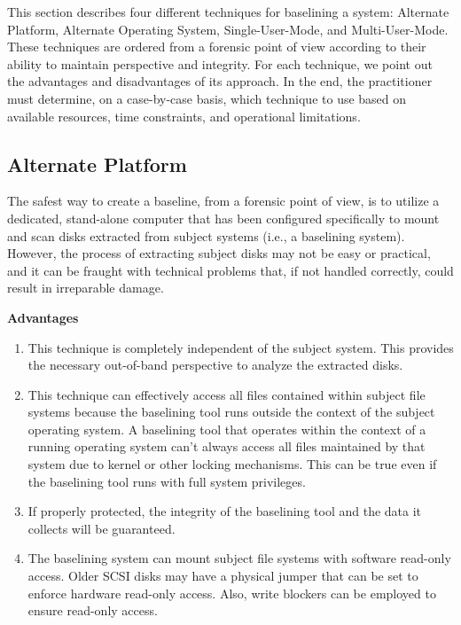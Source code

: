 \documentclass[10pt]{article}
\begin{document}
This section describes four different techniques for baselining a
system: Alternate Platform, Alternate Operating System,
Single-User-Mode, and Multi-User-Mode.  These techniques are ordered
from a forensic point of view according to their ability to maintain
perspective and integrity.  For each technique, we point out the
advantages and disadvantages of its approach.  In the end, the
practitioner must determine, on a case-by-case basis, which technique
to use based on available resources, time constraints, and operational
limitations.

\subsection{Alternate Platform}

The safest way to create a baseline, from a forensic point of view, is
to utilize a dedicated, stand-alone computer that has been configured
specifically to mount and scan disks extracted from subject systems
(i.e., a baselining system).  However, the process of extracting
subject disks may not be easy or practical, and it can be fraught with
technical problems that, if not handled correctly, could result in
irreparable damage.

  \textbf{Advantages}

\begin{enumerate}

  \item
  This technique is completely independent of the subject system.
  This provides the necessary out-of-band perspective to analyze the
  extracted disks.

  \item
  This technique can effectively access all files contained within
  subject file systems because the baselining tool runs outside the
  context of the subject operating system.  A baselining tool that
  operates within the context of a running operating system can't
  always access all files maintained by that system due to kernel or
  other locking mechanisms.  This can be true even if the baselining
  tool runs with full system privileges.

  \item
  If properly protected, the integrity of the baselining tool and the
  data it collects will be guaranteed.

  \item
  The baselining system can mount subject file systems with software
  read-only access.  Older SCSI disks may have a physical jumper that
  can be set to enforce hardware read-only access.  Also, write
  blockers can be employed to ensure read-only access.

\end{enumerate}
\end{document}
